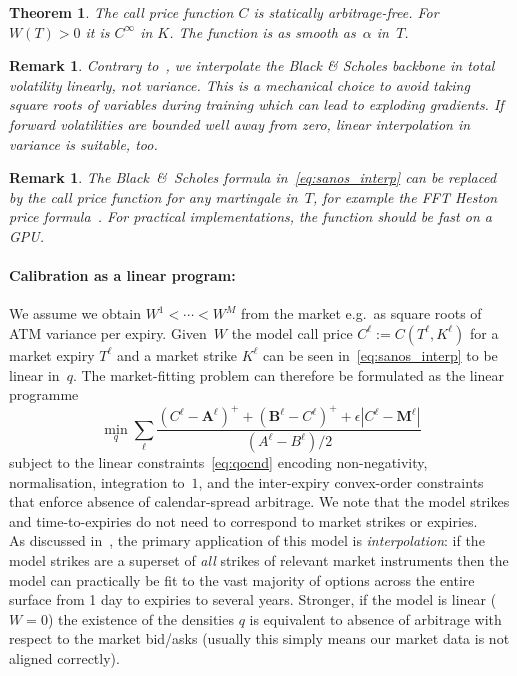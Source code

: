 \documentclass[11pt,a4paper]{article}
\newtheorem{theorem}[definition]{Theorem}
\newtheorem{remark}[definition]{Remark}
\begin{document}
\begin{theorem}
    The call price function $C$ is statically arbitrage-free.
For $W(T)>0$ it is $C^\infty$ in $K$. The function is as smooth as~$\alpha$ in~$T$.
\end{theorem}

\begin{remark}
    Contrary to~\citet{SANOS2026}, we interpolate the Black \& Scholes backbone in total volatility linearly, not variance.
    This is a mechanical choice to avoid taking square roots of variables during training
    which can lead to exploding gradients. If forward volatilities are bounded well away from
    zero, linear interpolation in variance is suitable, too.
\end{remark}

\begin{remark}
    The Black~\&~Scholes formula in~\eqref{eq:sanos_interp} can be replaced
    by the call price function for any martingale in~$T$, for example the FFT Heston price formula~\citep{carrmadan1999}.
    For practical implementations, the
    function should be fast on a GPU.
\end{remark}

\paragraph{Calibration as a linear program:}
 We assume we obtain $W^1<\cdots<W^M$
from the market e.g.~as square roots of ATM variance per expiry.
Given~$W$ the model call price $C^\ell := C(T^\ell, K^\ell)$ for a market expiry $T^\ell$ and
a market strike $K^\ell$
can be seen in~\eqref{eq:sanos_interp}
to be linear in~$q$.
The market-fitting problem can therefore be formulated as the linear programme
\begin{equation}
  \label{eq:lp}
  \min_{q} \sum_\ell \frac{
    (C^\ell - \bm{A}^\ell)^+ + (\bm{B}^\ell - C^\ell)^+ + \epsilon |C^\ell - \bm{M}^\ell|
  }{ (A^\ell - B^\ell)/2}
\end{equation}
subject to the linear constraints~\eqref{eq:qocnd} encoding non-negativity, normalisation, integration to~$1$, and the inter-expiry convex-order constraints that enforce absence of calendar-spread
arbitrage. We note that the model strikes and time-to-expiries do not need to correspond
to market strikes or expiries.\\

As discussed in~\citet{SANOS2026}, the primary application of this model is \emph{interpolation}: if the model strikes
are a superset of \emph{all} strikes of relevant market instruments then the model can practically be fit to the
vast majority of options across the entire surface from 1 day to expiries to several years. Stronger, if the model is
linear ($W=0$) the existence of the densities $q$ is equivalent to absence of arbitrage with respect to the market bid/asks (usually
this simply means our market data is not aligned correctly).
\end{document}

